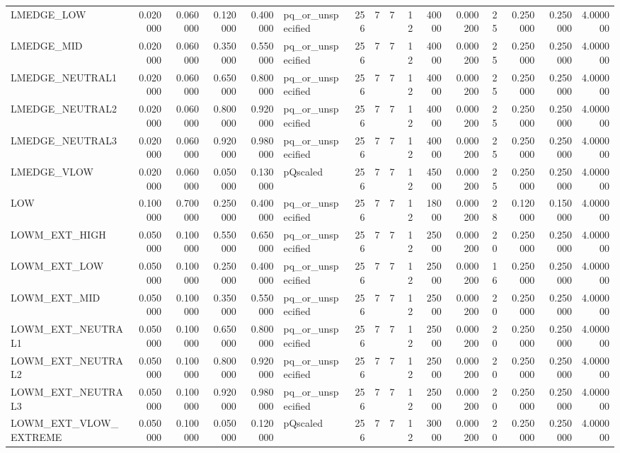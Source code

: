 \begin{longtable}{lrrrrlrrrrrrrrrr}
LMEDGE_LOW & 0.020000 & 0.060000 & 0.120000 & 0.400000 & pq_or_unspecified & 256 & 7 & 7 & 12 & 40000 & 0.000200 & 25 & 0.250000 & 0.250000 & 4.000000 \\
LMEDGE_MID & 0.020000 & 0.060000 & 0.350000 & 0.550000 & pq_or_unspecified & 256 & 7 & 7 & 12 & 40000 & 0.000200 & 25 & 0.250000 & 0.250000 & 4.000000 \\
LMEDGE_NEUTRAL1 & 0.020000 & 0.060000 & 0.650000 & 0.800000 & pq_or_unspecified & 256 & 7 & 7 & 12 & 40000 & 0.000200 & 25 & 0.250000 & 0.250000 & 4.000000 \\
LMEDGE_NEUTRAL2 & 0.020000 & 0.060000 & 0.800000 & 0.920000 & pq_or_unspecified & 256 & 7 & 7 & 12 & 40000 & 0.000200 & 25 & 0.250000 & 0.250000 & 4.000000 \\
LMEDGE_NEUTRAL3 & 0.020000 & 0.060000 & 0.920000 & 0.980000 & pq_or_unspecified & 256 & 7 & 7 & 12 & 40000 & 0.000200 & 25 & 0.250000 & 0.250000 & 4.000000 \\
LMEDGE_VLOW & 0.020000 & 0.060000 & 0.050000 & 0.130000 & pQscaled & 256 & 7 & 7 & 12 & 45000 & 0.000200 & 25 & 0.250000 & 0.250000 & 4.000000 \\
LOW & 0.100000 & 0.700000 & 0.250000 & 0.400000 & pq_or_unspecified & 256 & 7 & 7 & 12 & 18000 & 0.000200 & 28 & 0.120000 & 0.150000 & 4.000000 \\
LOWM_EXT_HIGH & 0.050000 & 0.100000 & 0.550000 & 0.650000 & pq_or_unspecified & 256 & 7 & 7 & 12 & 25000 & 0.000200 & 20 & 0.250000 & 0.250000 & 4.000000 \\
LOWM_EXT_LOW & 0.050000 & 0.100000 & 0.250000 & 0.400000 & pq_or_unspecified & 256 & 7 & 7 & 12 & 25000 & 0.000200 & 16 & 0.250000 & 0.250000 & 4.000000 \\
LOWM_EXT_MID & 0.050000 & 0.100000 & 0.350000 & 0.550000 & pq_or_unspecified & 256 & 7 & 7 & 12 & 25000 & 0.000200 & 20 & 0.250000 & 0.250000 & 4.000000 \\
LOWM_EXT_NEUTRAL1 & 0.050000 & 0.100000 & 0.650000 & 0.800000 & pq_or_unspecified & 256 & 7 & 7 & 12 & 25000 & 0.000200 & 20 & 0.250000 & 0.250000 & 4.000000 \\
LOWM_EXT_NEUTRAL2 & 0.050000 & 0.100000 & 0.800000 & 0.920000 & pq_or_unspecified & 256 & 7 & 7 & 12 & 25000 & 0.000200 & 20 & 0.250000 & 0.250000 & 4.000000 \\
LOWM_EXT_NEUTRAL3 & 0.050000 & 0.100000 & 0.920000 & 0.980000 & pq_or_unspecified & 256 & 7 & 7 & 12 & 25000 & 0.000200 & 20 & 0.250000 & 0.250000 & 4.000000 \\
LOWM_EXT_VLOW_EXTREME & 0.050000 & 0.100000 & 0.050000 & 0.120000 & pQscaled & 256 & 7 & 7 & 12 & 30000 & 0.000200 & 20 & 0.250000 & 0.250000 & 4.000000 \\

\end{longtable}
